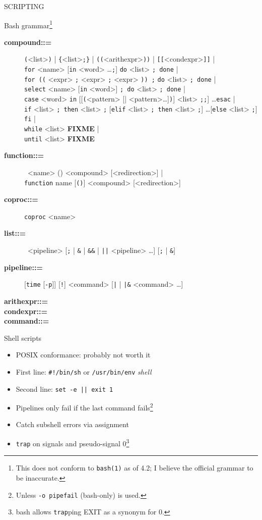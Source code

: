\documentclass[mathserif,xcolor={dvipsnames,table}]{beamer}
\begin{document}
\begin{frame}
\huge{SCRIPTING}
\end{frame}

\begin{frame}{Bash grammar\footnote{\tiny{This does not conform to {\tt bash(1)} as of 4.2; I believe the official grammar to be inaccurate.}}}
\tiny{
\begin{description}
\item[\textbf{compound::=}] {\tt(}<list>{\tt)} | {\tt\{}<list>{\tt;\}} | {\tt((}<arithexpr>{\tt))} | {\tt[[}<condexpr>{\tt]]} |\\
 {\tt for} <name> [{\tt in} <word> \ldots {\tt;}] {\tt do} <list> {\tt; done} |\\
 {\tt for ((} <expr> {\tt;} <expr> {\tt;} <expr> {\tt)) ;} {\tt do} <list> {\tt; done} |\\
 {\tt select} <name> [{\tt in} <word>] {\tt; do} <list> {\tt; done} |\\
 {\tt case} <word> {\tt in} [[{\tt(}<pattern> [| <pattern>\ldots]{\tt)}] <list> {\tt;;}] \ldots {\tt esac} |\\
 {\tt if} <list> {\tt; then} <list> {\tt;} [{\tt elif} <list> {\tt; then} <list> {\tt;}] \ldots [{\tt else} <list> {\tt;}] {\tt fi} |\\
 {\tt while} <list> \textbf{FIXME} |\\
 {\tt until} <list> \textbf{FIXME}
\item[\textbf{function::=}] \ <name> () <compound> [<redirection>] | \\
 {\tt function} name [{\tt ()}] <compound> [<redirection>]
\item[\textbf{coproc::=}] {\tt coproc} <name> 
\item[\textbf{list::=}] \ <pipeline> [{\tt;} | {\tt\&} | {\tt\&\&} | {\tt||} <pipeline> \ldots] [{\tt;} | {\tt\&}]
\item[\textbf{pipeline::=}] [{\tt time} [{\tt -p}]] [{\tt!}] <command> [{\tt|} | {\tt|\&} <command> \ldots]
\item[\textbf{arithexpr::=}]
\item[\textbf{condexpr::=}]
\item[\textbf{command::=}]
\end{description}
}
\end{frame}

\begin{frame}{Shell scripts}
\begin{itemize}
\item POSIX conformance: probably not worth it
\item First line: \texttt{\#!/bin/sh} or \texttt{/usr/bin/env} \textit{shell}
\item Second line: \texttt{set -e || exit 1}
\item Pipelines only fail if the last command fails\footnote{Unless \texttt{-o pipefail} (bash-only) is used.}
\item Catch subshell errors via assignment
\item \texttt{trap} on signals and pseudo-signal 0\footnote{bash allows \texttt{trap}ping EXIT as a synonym for 0.}
\end{itemize}
\end{frame}
\end{document}
